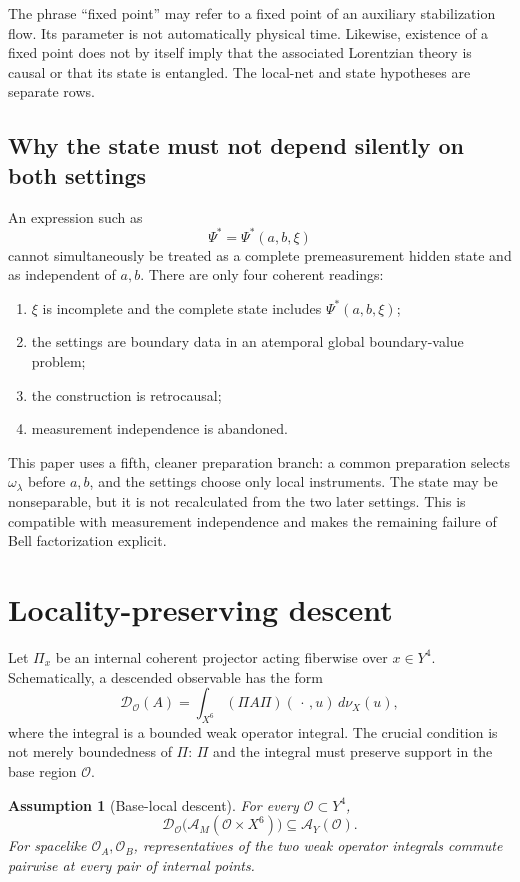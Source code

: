 \documentclass[11pt]{article}
\newcommand{\cA}{\mathcal{A}}
\newcommand{\cD}{\mathcal{D}}
\newtheorem{assumption}[theorem]{Assumption}
\theoremstyle{remark}
\begin{document}
The phrase ``fixed point'' may refer to a fixed point of an auxiliary
stabilization flow.  Its parameter is not automatically physical time.
Likewise, existence of a fixed point does not by itself imply that the
associated Lorentzian theory is causal or that its state is entangled.  The
local-net and state hypotheses are separate rows.

\subsection{Why the state must not depend silently on both settings}

An expression such as
\[
 \Psi^\ast=\Psi^\ast(a,b,\xi)
\]
cannot simultaneously be treated as a complete premeasurement hidden state
and as independent of $a,b$.  There are only four coherent readings:

\begin{enumerate}[label=(\alph*)]
\item $\xi$ is incomplete and the complete state includes
$\Psi^\ast(a,b,\xi)$;
\item the settings are boundary data in an atemporal global boundary-value
problem;
\item the construction is retrocausal;
\item measurement independence is abandoned.
\end{enumerate}

This paper uses a fifth, cleaner preparation branch: a common preparation
selects $\omega_\lambda$ before $a,b$, and the settings choose only local
instruments.  The state may be nonseparable, but it is not recalculated from
the two later settings.  This is compatible with measurement independence and
makes the remaining failure of Bell factorization explicit.

\section{Locality-preserving descent}
\label{sec:descent}

Let $\Pi_x$ be an internal coherent projector acting fiberwise over
$x\in Y^4$.  Schematically, a descended observable has the form
\[
 \cD_{\mathcal O}(A)
 =
 \int_{X^6}(\Pi A\Pi)(\,\cdot\,,u)\,d\nu_X(u),
\]
where the integral is a bounded weak operator integral.  The crucial
condition is not merely boundedness of $\Pi$: $\Pi$ and the integral must
preserve support in the base region $\mathcal O$.

\begin{assumption}[Base-local descent]
\label{ass:base-local}
For every $\mathcal O\subset Y^4$,
\[
 \cD_{\mathcal O}
 \bigl(\cA_M(\mathcal O\times X^6)\bigr)
 \subseteq \cA_Y(\mathcal O).
\]
For spacelike $\mathcal O_A,\mathcal O_B$, representatives of the two weak
operator integrals commute pairwise at every pair of internal points.
\end{assumption}
\end{document}
